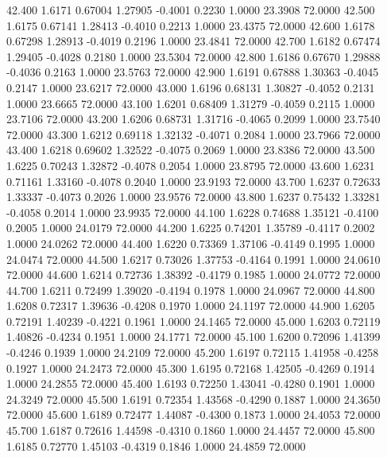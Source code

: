   42.400   1.6171   0.67004   1.27905  -0.4001   0.2230   1.0000  23.3908  72.0000
  42.500   1.6175   0.67141   1.28413  -0.4010   0.2213   1.0000  23.4375  72.0000
  42.600   1.6178   0.67298   1.28913  -0.4019   0.2196   1.0000  23.4841  72.0000
  42.700   1.6182   0.67474   1.29405  -0.4028   0.2180   1.0000  23.5304  72.0000
  42.800   1.6186   0.67670   1.29888  -0.4036   0.2163   1.0000  23.5763  72.0000
  42.900   1.6191   0.67888   1.30363  -0.4045   0.2147   1.0000  23.6217  72.0000
  43.000   1.6196   0.68131   1.30827  -0.4052   0.2131   1.0000  23.6665  72.0000
  43.100   1.6201   0.68409   1.31279  -0.4059   0.2115   1.0000  23.7106  72.0000
  43.200   1.6206   0.68731   1.31716  -0.4065   0.2099   1.0000  23.7540  72.0000
  43.300   1.6212   0.69118   1.32132  -0.4071   0.2084   1.0000  23.7966  72.0000
  43.400   1.6218   0.69602   1.32522  -0.4075   0.2069   1.0000  23.8386  72.0000
  43.500   1.6225   0.70243   1.32872  -0.4078   0.2054   1.0000  23.8795  72.0000
  43.600   1.6231   0.71161   1.33160  -0.4078   0.2040   1.0000  23.9193  72.0000
  43.700   1.6237   0.72633   1.33337  -0.4073   0.2026   1.0000  23.9576  72.0000
  43.800   1.6237   0.75432   1.33281  -0.4058   0.2014   1.0000  23.9935  72.0000
  44.100   1.6228   0.74688   1.35121  -0.4100   0.2005   1.0000  24.0179  72.0000
  44.200   1.6225   0.74201   1.35789  -0.4117   0.2002   1.0000  24.0262  72.0000
  44.400   1.6220   0.73369   1.37106  -0.4149   0.1995   1.0000  24.0474  72.0000
  44.500   1.6217   0.73026   1.37753  -0.4164   0.1991   1.0000  24.0610  72.0000
  44.600   1.6214   0.72736   1.38392  -0.4179   0.1985   1.0000  24.0772  72.0000
  44.700   1.6211   0.72499   1.39020  -0.4194   0.1978   1.0000  24.0967  72.0000
  44.800   1.6208   0.72317   1.39636  -0.4208   0.1970   1.0000  24.1197  72.0000
  44.900   1.6205   0.72191   1.40239  -0.4221   0.1961   1.0000  24.1465  72.0000
  45.000   1.6203   0.72119   1.40826  -0.4234   0.1951   1.0000  24.1771  72.0000
  45.100   1.6200   0.72096   1.41399  -0.4246   0.1939   1.0000  24.2109  72.0000
  45.200   1.6197   0.72115   1.41958  -0.4258   0.1927   1.0000  24.2473  72.0000
  45.300   1.6195   0.72168   1.42505  -0.4269   0.1914   1.0000  24.2855  72.0000
  45.400   1.6193   0.72250   1.43041  -0.4280   0.1901   1.0000  24.3249  72.0000
  45.500   1.6191   0.72354   1.43568  -0.4290   0.1887   1.0000  24.3650  72.0000
  45.600   1.6189   0.72477   1.44087  -0.4300   0.1873   1.0000  24.4053  72.0000
  45.700   1.6187   0.72616   1.44598  -0.4310   0.1860   1.0000  24.4457  72.0000
  45.800   1.6185   0.72770   1.45103  -0.4319   0.1846   1.0000  24.4859  72.0000
